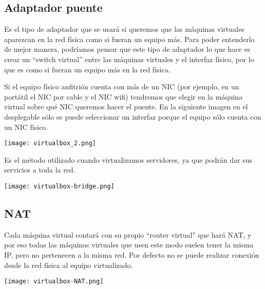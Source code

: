 \subsection{Adaptador puente}
Es el tipo de adaptador que se usará si queremos que las máquinas virtuales aparezcan en la red física como si fueran un equipo más. Para poder entenderlo de mejor manera, podríamos pensar que este tipo de adaptador lo que hace es crear un “switch virtual” entre las máquinas virtuales y el interfaz físico, por lo que es como si fueran un equipo más en la red física.

Si el equipo físico anfitrión cuenta con más de un NIC (por ejemplo, en un portátil el NIC por cable y el NIC wifi) tendremos que elegir en la máquina virtual sobre qué NIC queremos hacer el puente. En la siguiente imagen en el desplegable sólo se puede seleccionar un interfaz porque el equipo sólo cuenta con un NIC físico.

\begin{center}
    \vspace{-10pt}
    \texttt{[image: virtualbox\_2.png]}
    \vspace{-20pt}
\end{center}

Es el método utilizado cuando virtualizamos servidores, ya que podrán dar sus servicios a toda la red.

\begin{center}
    \vspace{-10pt}
    \texttt{[image: virtualbox-bridge.png]}
    \vspace{-10pt}
    \vspace{-20pt}
\end{center}

\subsection{NAT}
Cada máquina virtual contará con su propio “router virtual” que hará NAT, y por eso todas las máquinas virtuales que usen este modo suelen tener la misma IP, pero no pertenecen a la misma red.
Por defecto no se puede realizar conexión desde la red física al equipo virtualizado.

\begin{center}
    \vspace{-10pt}
    \texttt{[image: virtualbox-NAT.png]}
    \vspace{-10pt}
    \vspace{-20pt}
\end{center}

